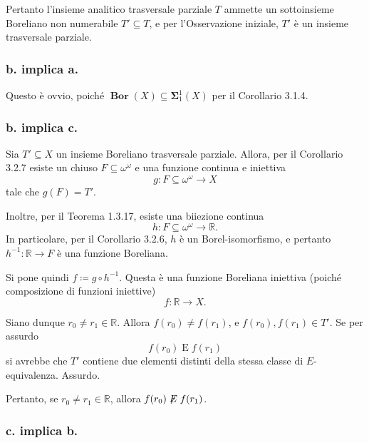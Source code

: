 \documentclass{article}
\newcommand{\1}{\mathds{1}}
\newcommand{\R}{\mathds{R}}
\begin{document}
Pertanto l'insieme analitico trasversale parziale \(T\) ammette un sottoinsieme Boreliano non numerabile \(T' \subseteq T\), e per l'Osservazione iniziale, \(T'\) è un insieme trasversale parziale.
\subsubsection{b. implica a.}
\label{sec:org386d496}

Questo è ovvio, poiché \(\bm{{\operatorname{Bor}}}(X) \subseteq \bm{\Sigma}_{1}^{1}(X)\) per il Corollario 3.1.4.
\subsubsection{b. implica c.}
\label{sec:org650759c}

Sia \(T' \subseteq X\) un insieme Boreliano trasversale parziale. Allora, per il Corollario 3.2.7 esiste un chiuso \(F \subseteq \omega^{\omega}\) e una funzione continua e iniettiva
\begin{equation*}
g: F \subseteq \omega^{\omega}\to X
\end{equation*}
tale che \(g(F)=T'\).

Inoltre, per il Teorema 1.3.17, esiste una biiezione continua
\begin{equation*}
h: F \subseteq \omega^{\omega}\to \R.
\end{equation*}
In particolare, per il Corollario 3.2.6, \(h\) è un Borel-isomorfismo, e pertanto \(h^{-1}: \R\to F\) è una funzione Boreliana.

Si pone quindi \(f\coloneqq g\circ h^{-1}\). Questa è una funzione Boreliana iniettiva (poiché composizione di funzioni iniettive)
\begin{equation*}
f: \R\to X.
\end{equation*}

Siano dunque \(r_{0}\neq r_{1} \in \R\). Allora \(f(r_{0})\neq f(r_{1})\), e \(f(r_{0}), f(r_{1}) \in T'\). Se per assurdo
\begin{equation*}
f(r_{0})\mathrel{E} f(r_{1})
\end{equation*}
si avrebbe che \(T'\) contiene due elementi distinti della stessa classe di \(E\)-equivalenza. Assurdo.

Pertanto, se \(r_{0}\neq r_{1} \in \R\), allora \(f(r_{0})\not\mathrel{E}f(r_{1})\).
\subsubsection{c. implica b.}
\label{sec:orgc543721}
\end{document}
